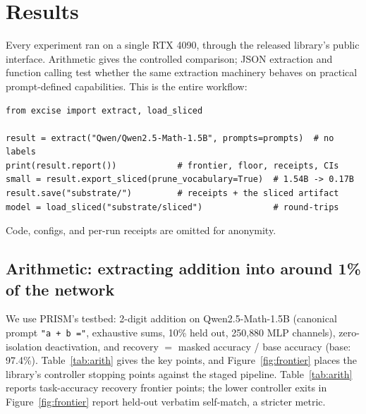 \documentclass{article}
\begin{document}
\section{Results}\label{sec:results}

Every experiment ran on a single RTX 4090, through the released library's
public interface. Arithmetic gives the controlled comparison; JSON extraction
and function calling test whether the same extraction machinery behaves on
practical prompt-defined capabilities. This is the entire workflow:

\noindent\begin{minipage}{\linewidth}
\begin{lstlisting}[style=py]
from excise import extract, load_sliced

result = extract("Qwen/Qwen2.5-Math-1.5B", prompts=prompts)  # no labels
print(result.report())            # frontier, floor, receipts, CIs
small = result.export_sliced(prune_vocabulary=True)  # 1.54B -> 0.17B
result.save("substrate/")         # receipts + the sliced artifact
model = load_sliced("substrate/sliced")              # round-trips
\end{lstlisting}
\end{minipage}

\noindent Code, configs, and per-run receipts are omitted for anonymity.

\subsection{Arithmetic: extracting addition into around 1\% of the network}

We use PRISM's testbed: 2-digit addition on Qwen2.5-Math-1.5B
\citep{qwen25math} (canonical prompt \texttt{"a + b ="}, exhaustive sums, 10\%
held out, 250{,}880 MLP channels), zero-isolation deactivation, and recovery
$=$ masked accuracy / base accuracy (base: 97.4\%). Table~\ref{tab:arith}
gives the key points, and Figure~\ref{fig:frontier} places the library's
controller stopping points against the staged pipeline.
Table~\ref{tab:arith} reports task-accuracy recovery frontier points; the
lower controller exits in Figure~\ref{fig:frontier} report held-out verbatim
self-match, a stricter metric.
\end{document}
